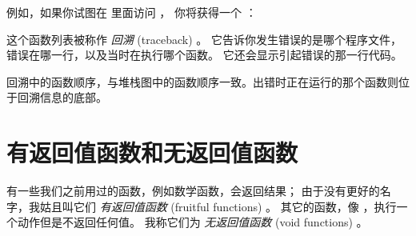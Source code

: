 
例如，如果你试图在  里面访问  ，
你将获得一个  ：



这个函数列表被称作 {\em 回溯} (traceback) 。
它告诉你发生错误的是哪个程序文件，错误在哪一行，以及当时在执行哪个函数。
它还会显示引起错误的那一行代码。


回溯中的函数顺序，与堆栈图中的函数顺序一致。出错时正在运行的那个函数则位于回溯信息的底部。


%
\section{有返回值函数和无返回值函数}
  
  
  
  



有一些我们之前用过的函数，例如数学函数，会返回结果；
由于没有更好的名字，我姑且叫它们 {\em 有返回值函数} (fruitful functions) 。
其它的函数，像  ，执行一个动作但是不返回任何值。
我称它们为 {\em 无返回值函数} (void functions) 。

